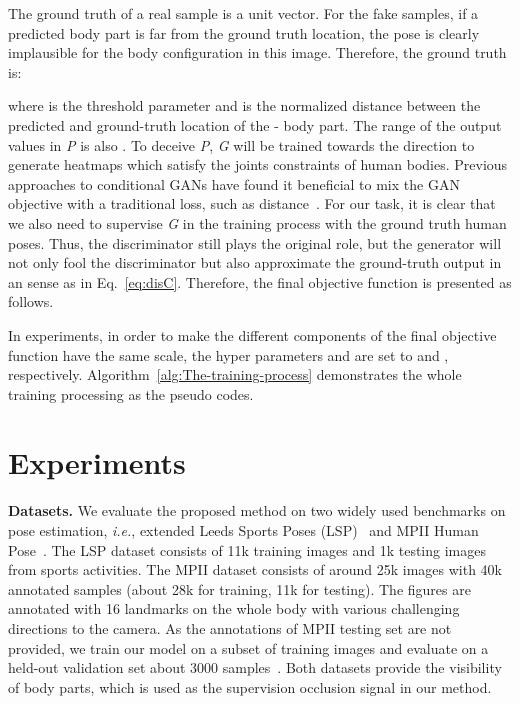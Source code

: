 \documentclass[10pt,letterpaper,twocolumn]{article}
\begin{document}
The ground truth  of a real sample is a  unit vector. For the fake samples, if a predicted body part is far from the ground truth location, the pose is clearly implausible  for the body configuration in this image. Therefore, the ground truth  is:

where  is the threshold parameter and  is the normalized distance between the predicted and ground-truth location of the - body part. The range of the output values in \textit{P} is also . To deceive \textit{P}, \textit{G} will be trained towards the direction to generate heatmaps which satisfy the joints constraints of human bodies. Previous approaches to conditional GANs have found it beneficial to mix the GAN objective with a  traditional loss, such as  distance~\cite{conf/cvpr/PathakKDDE16}. For our task, it is clear  that we also need to supervise \textit{G} in the training process with the ground truth human poses. Thus, the discriminator still plays the original role, but the generator will not only fool the discriminator but also approximate the ground-truth output in an  sense as in Eq.~\eqref{eq:disC}. Therefore, the final objective function is presented as follows.

In experiments, in order to make the different components of the final objective function have the same scale, the hyper parameters  and  are set to  and , respectively. Algorithm~\ref{alg:The-training-process} demonstrates the whole training processing as the pseudo codes.

\section{Experiments}\label{sec:Experiments}

\noindent \textbf{Datasets.} We evaluate the proposed method on two widely used benchmarks on pose estimation, \emph{i.e.}, extended Leeds Sports Poses (LSP)~\cite{conf/bmvc/JohnsonE10} and MPII Human Pose~\cite{conf/cvpr/AndrilukaPGS14}. The LSP dataset consists of 11k training images and 1k testing images from sports activities. The MPII dataset consists of around 25k images with 40k annotated samples (about 28k for training, 11k for testing). The figures are annotated with 16 landmarks on the whole body with various challenging directions to the camera. As the annotations of MPII testing set are not provided, we train our model on a subset of training images and evaluate on a held-out validation set about 3000 samples~\cite{conf/cvpr/TompsonGJLB15}. Both datasets provide the visibility of body parts, which is used as the supervision occlusion signal in our method.
\end{document}
